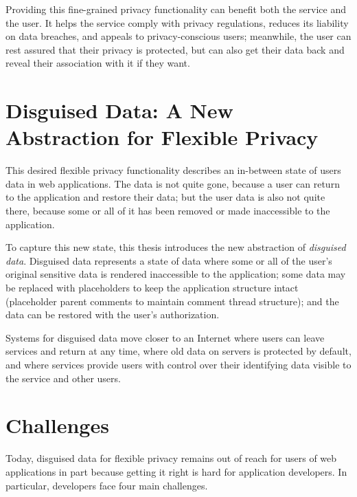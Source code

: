%
Providing this fine-grained privacy functionality can benefit both the service and the user.
%
It helps the service comply with privacy regulations, reduces its liability on
data breaches, and appeals to privacy-conscious users; meanwhile, the user can
rest assured that their privacy is protected, but can also get their data back
and reveal their association with it if they want.


\section{Disguised Data: A New Abstraction for Flexible Privacy}
%
This desired flexible privacy functionality describes an in-between state of
users data in web applications. The data is not quite gone, because a user
can return to the application and restore their data; but the user data is
also not quite there, because some or all of it has been removed or made
inaccessible to the application.
%

%
To capture this new state, this thesis introduces the new 
abstraction of \emph{disguised data}.  Disguised data represents a state of data
where \one{} some or all of the user's original sensitive data is rendered
inaccessible to the application; \two{} some data may be replaced with
placeholders to keep the application structure intact (\eg placeholder parent
comments to maintain comment thread structure); and \three{} the data can be
restored with the user's authorization.
%

%
Systems for disguised data move closer to an Internet where
users can leave services and return at any time, where old data on servers is
protected by default, and where services provide users with control over their
identifying data visible to the service and other users.
%

\section{Challenges} 
Today, disguised data for flexible privacy remains out of reach for users of
web applications in part because getting it right is hard for application
developers. In particular, developers face four main challenges.

